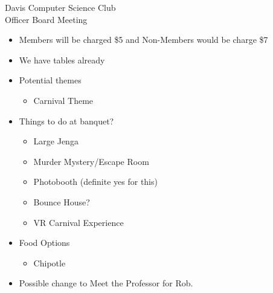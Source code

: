 \documentclass{article}
\begin{document}
\begin{Minutes}{Davis Computer Science Club\\Officer Board Meeting}

\missingExcused{%
}





\maketitle

\begin{itemize}
    \item Members will be charged \$5 and Non-Members would be charge \$7
    \item We have tables already
    \item Potential themes
    \begin{itemize}
    		\item Carnival Theme 
    \end{itemize}
    \item Things to do at banquet?
    	\begin{itemize}
    		\item Large Jenga
    		\item Murder Mystery/Escape Room
    		\item Photobooth (definite yes for this)
    		\item Bounce House?
    		\item VR Carnival Experience
    	\end{itemize}
    	\item Food Options
    	\begin{itemize}
    		\item Chipotle
    	\end{itemize}
\end{itemize}

\begin{itemize}
    \item Possible change to Meet the Professor for Rob.
\end{itemize}


\end{Minutes}
\end{document}
